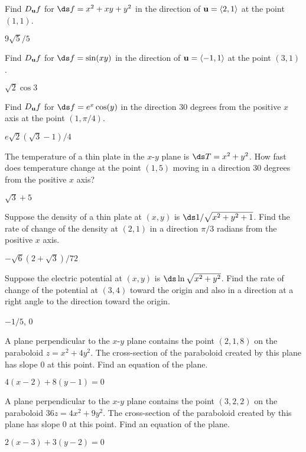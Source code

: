 \begin{exercises}

\exercise Find $D_{\bf u} f$ for 
$\ds f=x^2+xy+y^2$ in the direction of ${\bf u}=\langle 2,1\rangle$ 
at the point $(1,1)$.
\begin{answer} $9\sqrt5/5$
\end{answer}

\exercise Find $D_{\bf u} f$ for 
$\ds f=\sin(xy)$ in the direction of ${\bf u}=\langle -1,1\rangle$ 
at the point $(3,1)$.
\begin{answer} $\sqrt2\cos3$
\end{answer}

\exercise Find $D_{\bf u} f$ for 
$\ds f=e^x\cos(y)$ in the direction 30 degrees from the positive $x$ axis
at the point $(1,\pi/4)$.
\begin{answer} $e\sqrt2(\sqrt3-1)/4$
\end{answer}

\exercise The temperature of a thin plate in the $x$-$y$ plane is 
$\ds T=x^2+y^2$. How fast does temperature change at the point $(1,5)$
moving in a direction 30 degrees from the positive $x$ axis?
\begin{answer} $\sqrt3+5$
\end{answer}

\exercise Suppose the density of a thin plate at $(x,y)$ is
$\ds 1/\sqrt{x^2+y^2+1}$. Find the rate of change of the density at
$(2,1)$ in a direction $\pi/3$ radians from the positive $x$ axis.
\begin{answer} $-\sqrt6(2+\sqrt3)/72$
\end{answer}

\exercise Suppose the electric potential at $(x,y)$ is
$\ds\ln\sqrt{x^2+y^2}$. Find the rate of change of the potential at
$(3,4)$ toward the origin and also in a direction at a right angle to
the direction toward the origin.
\begin{answer} $-1/5$, $0$
\end{answer}

\exercise A plane perpendicular to the $x$-$y$ plane contains the
point $(2,1,8)$ on the paraboloid $z=x^2+4y^2$. The cross-section of
the paraboloid created by this plane has slope 0 at this point. Find
an equation of the plane.
\begin{answer} $4(x-2)+8(y-1)=0$
\end{answer}

\exercise A plane perpendicular to the $x$-$y$ plane contains the
point $(3,2,2)$ on the paraboloid $36z=4x^2+9y^2$. The cross-section
of the paraboloid created by this plane has slope 0 at this point.
Find an equation of the plane.
\begin{answer} $2(x-3)+3(y-2)=0$
\end{answer}


\end{exercises}

